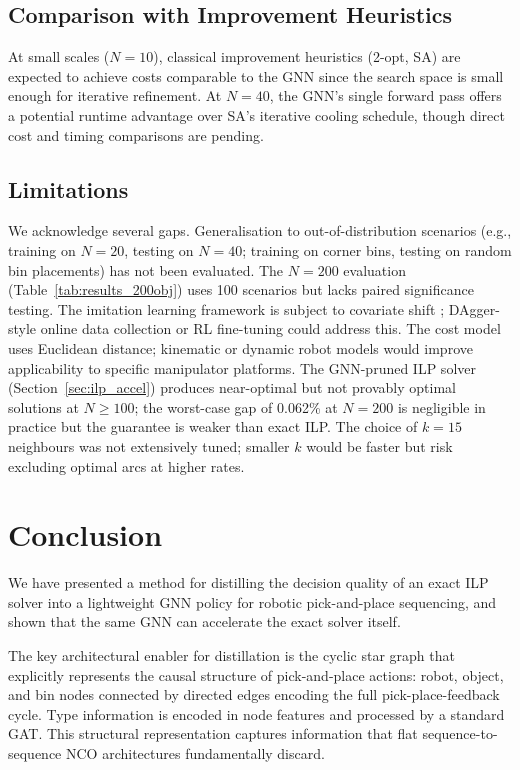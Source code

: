 \documentclass[conference]{IEEEtran}
\begin{document}
\subsection{Comparison with Improvement Heuristics}

At small scales ($N{=}10$), classical improvement heuristics (2-opt, SA) are expected to achieve costs comparable to the GNN since the search space is small enough for iterative refinement. At $N{=}40$, the GNN's single forward pass offers a potential runtime advantage over SA's iterative cooling schedule, though direct cost and timing comparisons are pending.

\subsection{Limitations}

We acknowledge several gaps. Generalisation to out-of-distribution scenarios (e.g., training on $N{=}20$, testing on $N{=}40$; training on corner bins, testing on random bin placements) has not been evaluated. The $N{=}200$ evaluation (Table~\ref{tab:results_200obj}) uses 100 scenarios but lacks paired significance testing. The imitation learning framework is subject to covariate shift \cite{ross2011dagger}; DAgger-style online data collection or RL fine-tuning could address this. The cost model uses Euclidean distance; kinematic or dynamic robot models would improve applicability to specific manipulator platforms. The GNN-pruned ILP solver (Section~\ref{sec:ilp_accel}) produces near-optimal but not provably optimal solutions at $N{\ge}100$; the worst-case gap of 0.062\% at $N{=}200$ is negligible in practice but the guarantee is weaker than exact ILP. The choice of $k{=}15$ neighbours was not extensively tuned; smaller $k$ would be faster but risk excluding optimal arcs at higher rates.

\section{Conclusion}\label{sec:conclusion}

We have presented a method for distilling the decision quality of an exact ILP solver into a lightweight GNN policy for robotic pick-and-place sequencing, and shown that the same GNN can accelerate the exact solver itself.

The key architectural enabler for distillation is the cyclic star graph that explicitly represents the causal structure of pick-and-place actions: robot, object, and bin nodes connected by directed edges encoding the full pick-place-feedback cycle. Type information is encoded in node features and processed by a standard GAT. This structural representation captures information that flat sequence-to-sequence NCO architectures fundamentally discard.
\end{document}
